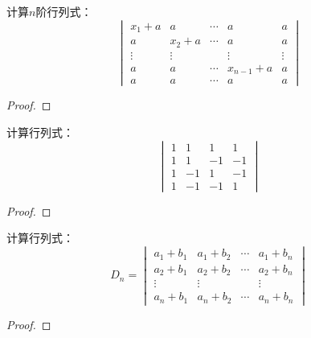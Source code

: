 \begin{problem}
计算\(n\)阶行列式：
\begin{equation*}
    \begin{vmatrix}
        x_{1}+a & a       & \cdots & a         & a      \\
        a       & x_{2}+a & \cdots & a         & a      \\
        \vdots  & \vdots  &        & \vdots    & \vdots \\
        a       & a       & \cdots & x_{n-1}+a & a      \\
        a       & a       & \cdots & a         & a
    \end{vmatrix}
\end{equation*}
\end{problem}
\begin{proof}

\end{proof}

\setcounter{problem}{15}
\begin{problem}
计算行列式：
\begin{equation*}
    \begin{vmatrix}
        1 & 1  & 1  & 1  \\
        1 & 1  & -1 & -1 \\
        1 & -1 & 1  & -1 \\
        1 & -1 & -1 & 1
    \end{vmatrix}
\end{equation*}
\end{problem}
\begin{proof}

\end{proof}

\begin{problem}
计算行列式：
\begin{equation*}
    D_n=
    \begin{vmatrix}
        a_{1}+b_{1} & a_{1}+b_{2} & \cdots & a_{1}+b_{n} \\
        a_{2}+b_{1} & a_{2}+b_{2} & \cdots & a_{2}+b_{n} \\
        \vdots      & \vdots      &        & \vdots      \\
        a_{n}+b_{1} & a_{n}+b_{2} & \cdots & a_{n}+b_{n}
    \end{vmatrix}
\end{equation*}
\end{problem}
\begin{proof}

\end{proof}

